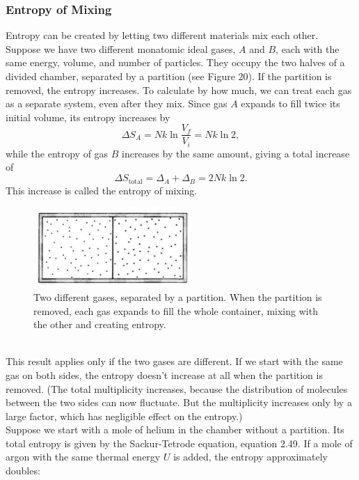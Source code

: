 \documentclass[11pt]{exam}
\begin{document}
\subsubsection*{Entropy of Mixing}
Entropy can be created by letting two different materials mix each other. Suppose we have two different monatomic ideal gases, $A$ and $B$, each with the same energy, volume, and number of particles. They occupy the two halves of a divided chamber, separated by a partition (see Figure 20). If the partition is removed, the entropy increases. To calculate by how much, we can treat each gas as a separate system, even after they mix. Since gas $A$ expands to fill twice its initial volume, its entropy increases by 
\begin{equation}\tag{2.58}
\Delta S_A = Nk\ln{\frac{V_f}{V_i}}=Nk\ln{2},    
\end{equation}
while the entropy of gas $B$ increases by the same amount, giving a total increase of 
\begin{equation}\tag{2.54}
\Delta S_\text{total} = \Delta_A + \Delta_B = 2Nk\ln{2}. 
\end{equation}
This increase is called the entropy of mixing. 
\begin{figure}[htp]
    \centering
    \includegraphics[width=6cm]{figure20.png}
    \caption{Two different gases, separated by a partition. When the partition is removed, each gas expands to fill the whole container, mixing with the other and creating entropy.}
\label{fig:momentum-space-volume}
\end{figure}\\
\hspace*{10mm}This result applies only if the two gases are different. If we start with the same gas on both sides, the entropy doesn't increase at all when the partition is removed. (The total multiplicity increases, because the distribution of molecules between the two sides can now fluctuate. But the multiplicity increases only by a large factor, which has negligible effect on the entropy.)\\
\hspace*{10mm}Suppose we start with a mole of helium in the chamber without a partition. Its total entropy is given by the Sackur-Tetrode equation, equation 2.49. If a mole of argon with the same thermal energy $U$ is added, the entropy approximately doubles:
\end{document}
